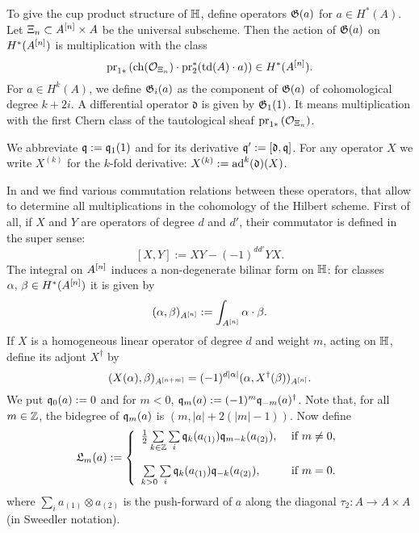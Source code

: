 \begin{definition}
To give the cup product structure of $\mathbb{H}$, define operators $\mathfrak{G}(a)$ for $a \in H^*(A)$. Let $\Xi_n \subset A^{[n]}\times A$ be the universal subscheme. Then the action of $\mathfrak{G}(a)$ on $H^*(A^{[n]})$ is multiplication with the class
$$
\operatorname{pr}_{1*}\left( \operatorname{ch}(\mathcal{O}_{\Xi_n})\cdot \operatorname{pr}_2^*(\operatorname{td}(A)\cdot a) \right) \in H^*(A^{[n]}).
$$
For $a \in H^k(A)$, we define $\mathfrak{G}_i(a)$ as the component of $\mathfrak{G}(a)$ of cohomological degree $k+2i$. A differential operator $\mathfrak{d}$ is given by $\mathfrak{G}_1(1)$. It means multiplication with the first Chern class of the tautological sheaf $\operatorname{pr}_{1*}\left( \mathcal{O}_{\Xi_n}\right)$.
\end{definition}
\begin{notation} 
We abbreviate $\mathfrak{q} := \mathfrak{q}_1(1)$ and for its derivative $\mathfrak{q}':= [\mathfrak d, \mathfrak{q}]$. For any operator $X$ we write $X^{(k)}$ for the $k$-fold derivative: $X^{(k)} :=\operatorname{ad}^k(\mathfrak{d}) (X)$.
\end{notation}
In \cite{LehnSorger} and \cite{LiQinWang} we find various commutation relations between these operators, that allow to determine all multiplications in the cohomology of the Hilbert scheme. First of all, if $X$ and $Y$ are operators of degree $d$ and $d'$, their commutator is defined in the super sense: 
$$
[X,Y] := XY - (-1)^{dd'}YX.
$$
The integral on $A^{[n]}$ induces a non-degenerate bilinar form on $\mathbb{H}$: for classes $\alpha,\,\beta\in H^*(A^{[n]})$ it is given by
$$
(\alpha,\beta)_{A^{[n]}} :=  \int_{A^{[n]}}\alpha\cdot\beta.
$$
If $X$ is a homogeneous linear operator of degree $d$ and weight $m$, acting on $\mathbb{H}$, define its adjont $X^\dagger$ by
$$
(X(\alpha),\beta)_{A^{[n+m]}}  = (-1)^{d|\alpha|}( \alpha , X^\dagger (\beta))_{A^{[n]}}.
$$
We put $\mathfrak{q}_0(a) :=0$ and for $m<0$, $\mathfrak{q}_m(a) := (-1)^m \mathfrak{q}_{-m}(a)^\dagger$. Note that, for all $m\in\mathbb{Z}$, the bidegree of $\mathfrak{q}_m(a)$ is $(m,|a| + 2(|m|-1))$. Now define
$$
\mathfrak{L}_m(a) := \left\{ 
\begin{array}{ll}
 \tfrac{1}{2}\sum\limits_{k\in\Z}\sum\limits_{i}\q_k( a_{(1)})\q_{m-k}( a_{(2)}), & \text{ if } m\neq 0, \vspace{4mm}\\
 \sum\limits_{k>0}\sum\limits_{i}\q_k( a_{(1)})\q_{-k}( a_{(2)}), & \text{ if } m= 0. \\
\end{array}
\right.
$$
where $\sum_i a_{(1)}\otimes  a_{(2)}$ is the push-forward of $a$ along the diagonal $\tau_2 :A \rightarrow A\times A$ (in Sweedler notation).
